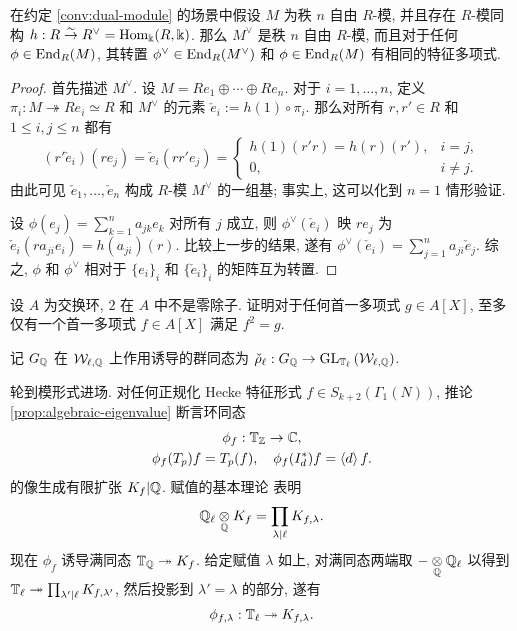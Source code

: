 \begin{lemma}
	在约定 \ref{conv:dual-module} 的场景中假设 $M$ 为秩 $n$ 自由 $R$-模, 并且存在 $R$-模同构 $h: R \stackrel{\sim}{\rightarrow} R^\vee = \operatorname{Hom}_\Bbbk(R, \Bbbk)$. 那么 $M^\vee$ 是秩 $n$ 自由 $R$-模, 而且对于任何 $\phi \in \operatorname{End}_R(M)$, 其转置 $\phi^\vee \in \operatorname{End}_R(M^\vee)$ 和 $\phi \in \operatorname{End}_R(M)$ 有相同的特征多项式.
\end{lemma}
\begin{proof}
	首先描述 $M^\vee$. 设 $M = Re_1 \oplus \cdots \oplus Re_n$. 对于 $i = 1, \ldots, n$, 定义 $\pi_i: M \twoheadrightarrow Re_i \simeq R$ 和 $M^\vee$ 的元素 $\check{e}_i := h(1) \circ \pi_i$. 那么对所有 $r, r' \in R$ 和 $1 \leq i, j \leq n$ 都有
	\[ (r' \check{e}_i) (r e_j) = \check{e}_i(r r' e_j) = \begin{cases}
		h(1)(r' r) = h(r)(r'), & i = j, \\
		0, & i \neq j.
	\end{cases}\]
	由此可见 $\check{e}_1, \ldots, \check{e}_n$ 构成 $R$-模 $M^\vee$ 的一组基; 事实上, 这可以化到 $n = 1$ 情形验证.

	设 $\phi(e_j) = \sum_{k=1}^n a_{jk} e_k$ 对所有 $j$ 成立, 则 $\phi^\vee(\check{e}_i)$ 映 $re_j$ 为 $\check{e}_i(ra_{ji} e_i) = h(a_{ji})(r)$. 比较上一步的结果, 遂有 $\phi^\vee(\check{e}_i) = \sum_{j=1}^n a_{ji} \check{e}_j$. 综之, $\phi$ 和 $\phi^\vee$ 相对于 $\{e_i\}_i$ 和 $\{\check{e}_i\}_i$ 的矩阵互为转置.
\end{proof}

\begin{exercise}\label{exo:monic-squareroot}
	设 $A$ 为交换环, $2$ 在 $A$ 中不是零除子. 证明对于任何首一多项式 $g \in A[X]$, 至多仅有一个首一多项式 $f \in A[X]$ 满足 $f^2 = g$.

\end{exercise}

记 $G_{\mathbb{Q}}$ 在 $\mathcal{W}_{\ell, \mathbb{Q}}$ 上作用诱导的群同态为 $\check{\rho}_\ell: G_{\mathbb{Q}} \to \operatorname{GL}_{\mathbb{T}_\ell}\left(\mathcal{W}_{\ell, \mathbb{Q}}\right)$.

轮到模形式进场. 对任何正规化 Hecke 特征形式 $f \in S_{k+2}(\Gamma_1(N))$, 推论 \ref{prop:algebraic-eigenvalue} 断言环同态
\begin{gather*}
	\phi_f: \mathbb{T}_{\mathbb{Z}} \to \mathbb{C}, \\
	\phi_f(T_p) f = T_p(f), \quad \phi_f(I_d^*) f = \left\langle d \right\rangle f.
\end{gather*}
的像生成有限扩张 $K_f | \mathbb{Q}$. 赋值的基本理论 \cite[定理 10.7.7]{Li1} 表明
\[ \mathbb{Q}_\ell \underset{\mathbb{Q}}{\otimes} K_f = \prod_{\lambda \mid \ell} K_{f,\lambda}. \]
现在 $\phi_f$ 诱导满同态 $\mathbb{T}_{\mathbb{Q}} \twoheadrightarrow K_f$. 给定赋值 $\lambda$ 如上, 对满同态两端取 $- \underset{\mathbb{Q}}{\otimes} \mathbb{Q}_\ell$ 以得到 $\mathbb{T}_\ell \twoheadrightarrow \prod_{\lambda' \mid \ell} K_{f, \lambda'}$, 然后投影到 $\lambda' = \lambda$ 的部分, 遂有
\begin{equation}
	\phi_{f, \lambda}: \mathbb{T}_\ell \twoheadrightarrow K_{f, \lambda}.
\end{equation}

